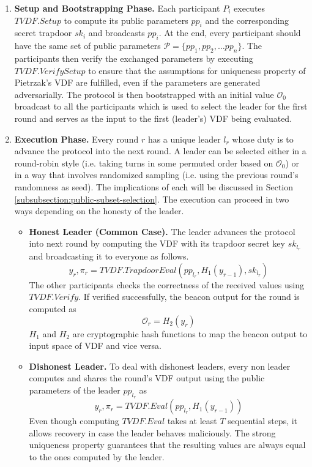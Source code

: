 \documentclass[letterpaper,twocolumn,10pt]{article}
\theoremstyle{definition}
\theoremstyle{remark}
\begin{document}
\begin{enumerate}
    \item \textbf{Setup and Bootstrapping Phase.} Each participant $P_i$ executes $TVDF.Setup$ to compute its public parameters $pp_i$ and the corresponding secret trapdoor $sk_i$ and broadcasts $pp_i$. At the end, every participant should have the same set of public parameters $\mathcal{P} = \{ pp_1, pp_2, \ldots pp_n \}$.  The participants then verify the exchanged parameters by executing $TVDF.VerifySetup$ to ensure that the assumptions for uniqueness property of Pietrzak’s VDF \cite{pietrzak2018simple} are fulfilled, even if the parameters are generated adversarially. The protocol is then bootstrapped with an initial value $\mathcal{O}_0$ broadcast to all the participants which is used to select the leader for the first round and serves as the input to the first (leader’s) VDF being evaluated.
    
    \item \textbf{Execution Phase.} Every round $r$ has a unique leader $l_r$ whose duty is to advance the protocol into the next round. A leader can be selected either in a round-robin style (i.e. taking turns in some permuted order based on $\mathcal{O}_0$) or in a way that involves randomized sampling (i.e. using the previous round’s randomness as seed). The implications of each will be discussed in Section \ref{subsubsection:public-subset-selection}. The execution can proceed in two ways depending on the honesty of the leader.
    \begin{itemize}
        \item \textbf{Honest Leader (Common Case).} The leader advances the protocol into next round by computing the VDF with its trapdoor secret key $sk_{l_r}$  and broadcasting it to everyone as follows. 
        $$y_r, \pi_r = TVDF.TrapdoorEval(pp_{l_r}, H_1(y_{r-1}), sk_{l_r})$$
        The other participants checks the correctness of the received values using $TVDF.Verify$. If verified successfully, the beacon output for the round is computed as 
        $$\mathcal{O}_r = H_2(y_r)$$
        $H_1$ and $H_2$ are cryptographic hash functions to map the beacon output to input space of VDF and vice versa.
        \item \textbf{Dishonest Leader.} To deal with dishonest leaders, every non leader computes and shares the round's VDF output using the public parameters of the leader $pp_{l_r}$ as
        $$y_r, \pi_r = TVDF.Eval(pp_{l_r}, H_1(y_{r-1}))$$
        Even though computing $TVDF.Eval$ takes at least $T$ sequential steps, it allows recovery in case the leader behaves maliciously. The strong uniqueness property guarantees that the resulting values are always equal to the ones computed by the leader.
    \end{itemize}
\end{enumerate}
\end{document}
